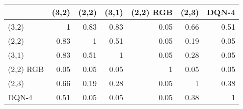 \begin{tabular}{lrrrrrr}
\hline
           &   (3,2) &   (2,2) &   (3,1) &   (2,2) RGB &   (2,3) &   DQN-4 \\
\hline
 (3,2)     &    1    &    0.83 &    0.83 &        0.05 &    0.66 &    0.51 \\
 (2,2)     &    0.83 &    1    &    0.51 &        0.05 &    0.19 &    0.05 \\
 (3,1)     &    0.83 &    0.51 &    1    &        0.05 &    0.28 &    0.05 \\
 (2,2) RGB &    0.05 &    0.05 &    0.05 &        1    &    0.05 &    0.05 \\
 (2,3)     &    0.66 &    0.19 &    0.28 &        0.05 &    1    &    0.38 \\
 DQN-4     &    0.51 &    0.05 &    0.05 &        0.05 &    0.38 &    1    \\
\hline
\end{tabular}